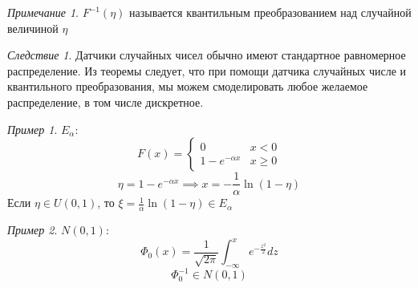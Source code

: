 \documentclass[english]{article}
\theoremstyle{plain}
\theoremstyle{remark}
\newtheorem*{remark}{Примечание}
\newtheorem{corollary}{Следствие}[theorem]
\newtheorem*{examp}{Пример}
\theoremstyle{definition}
\begin{document}
\begin{remark}
\(F^{-1}(\eta)\) называется квантильным преобразованием над случайной величиной \(\eta\)
\end{remark}
\begin{corollary}
Датчики случайных чисел обычно имеют стандартное равномерное распределение. Из теоремы следует, что при помощи датчика случайных числе и квантильного преобразования, мы можем смоделировать любое желаемое распределение, в том числе дискретное.
\end{corollary}
\begin{examp}
\(E_\alpha\):
\[ F(x) = \begin{cases}
0 & x < 0 \\
1 - e^{-\alpha x} & x \ge 0
\end{cases}\]
\[ \eta = 1 - e^{-\alpha x} \implies x = -\frac{1}{\alpha}\ln(1 - \eta) \]
Если \(\eta \in U(0, 1)\), то \(\xi = \frac{1}{\alpha} \ln(1 - \eta) \in E_\alpha\)
\end{examp}
\begin{examp}
\(N(0, 1)\):
\[ \Phi_0(x) = \frac{1}{\sqrt{2 \pi}} \int_{-\infty}^x  e^{-\frac{z^2}{2}} dz\]
\[ \Phi^{-1}_0 \in N(0, 1) \]
\end{examp}
\end{document}
